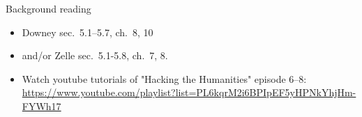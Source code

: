 \documentclass[aspectratio=169,usenames,dvipsnames]{beamer}
\begin{document}
\begin{frame}{Background reading}
    \begin{itemize}
        \item Downey sec.\ 5.1--5.7, ch.\ 8, 10
        \item and/or Zelle sec.\ 5.1-5.8, ch.\ 7, 8.
        \item Watch youtube tutorials of "Hacking the Humanities" episode 6--8:
            {\small \url{https://www.youtube.com/playlist?list=PL6kqrM2i6BPIpEF5yHPNkYhjHm-FYWh17}}
    \end{itemize}
\end{frame}
\end{document}
